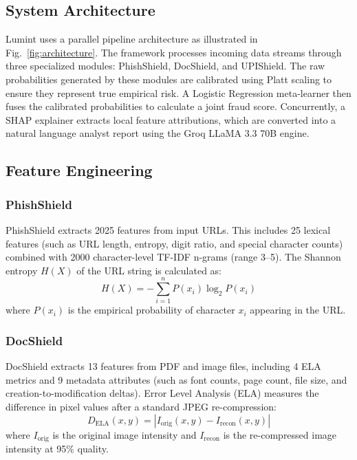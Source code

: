 \documentclass[journal]{IEEEtran}
\begin{document}
\subsection{System Architecture}
Lumint uses a parallel pipeline architecture as illustrated in Fig.~\ref{fig:architecture}. The framework processes incoming data streams through three specialized modules: PhishShield, DocShield, and UPIShield. The raw probabilities generated by these modules are calibrated using Platt scaling to ensure they represent true empirical risk. A Logistic Regression meta-learner then fuses the calibrated probabilities to calculate a joint fraud score. Concurrently, a SHAP explainer extracts local feature attributions, which are converted into a natural language analyst report using the Groq LLaMA 3.3 70B engine.

\subsection{Feature Engineering}

\subsubsection{PhishShield}
PhishShield extracts 2025 features from input URLs. This includes 25 lexical features (such as URL length, entropy, digit ratio, and special character counts) combined with 2000 character-level TF-IDF n-grams (range 3--5). The Shannon entropy $H(X)$ of the URL string is calculated as:
\begin{equation}
H(X) = - \sum_{i=1}^{n} P(x_i) \log_2 P(x_i)
\end{equation}
where $P(x_i)$ is the empirical probability of character $x_i$ appearing in the URL.

\subsubsection{DocShield}
DocShield extracts 13 features from PDF and image files, including 4 ELA metrics and 9 metadata attributes (such as font counts, page count, file size, and creation-to-modification deltas). Error Level Analysis (ELA) measures the difference in pixel values after a standard JPEG re-compression:
\begin{equation}
D_{\text{ELA}}(x, y) = |I_{\text{orig}}(x, y) - I_{\text{recon}}(x, y)|
\end{equation}
where $I_{\text{orig}}$ is the original image intensity and $I_{\text{recon}}$ is the re-compressed image intensity at 95\% quality.
\end{document}
